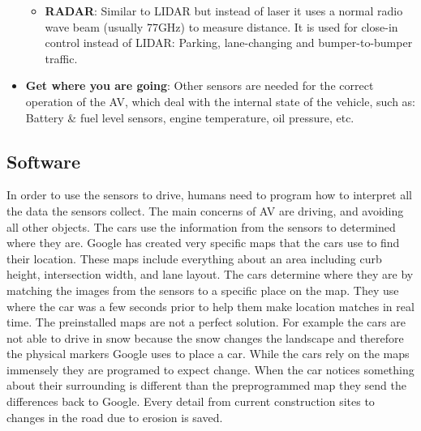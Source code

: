\documentclass[11pt]{article}
\begin{document}
\begin{itemize}
\begin{itemize}
			\item \textbf{RADAR}: Similar to LIDAR but instead of laser it uses a normal radio wave beam (usually 77GHz) to measure distance. It is used for close-in control instead of LIDAR: Parking, lane-changing and bumper-to-bumper traffic.
		\end{itemize}
	\item \textbf{Get where you are going}:
		Other sensors are needed for the correct operation of the AV, which deal with the internal state of the vehicle, such as: Battery \& fuel level sensors, engine temperature, oil pressure, etc.
\end{itemize}

\subsection{Software}
In order to use the sensors to drive, humans need to program how to interpret all the data the sensors collect. The main concerns of AV are driving, and avoiding all other objects. The cars use the information from the sensors to determined where they are. Google has created very specific maps that the cars use to find their location. These maps include everything about an area including curb height, intersection width, and lane layout. \cite{chrisurmson2016}
The cars determine where they are by matching the images from the sensors to
a specific place on the map. They use where the car was a few seconds prior to help them make location matches in real
time. The preinstalled maps are not a perfect solution. For example the
cars are not able to drive in snow because the snow changes the landscape and therefore the physical markers Google
uses to place a car.\cite{chrisurmson2016} While the cars rely on the maps immensely they are programed to expect change. When the car notices something about their surrounding is
different than the preprogrammed map they send the differences back to Google. Every detail from current construction sites to changes in the road due to erosion
is saved. \cite{chrisurmson2016}
\end{document}
